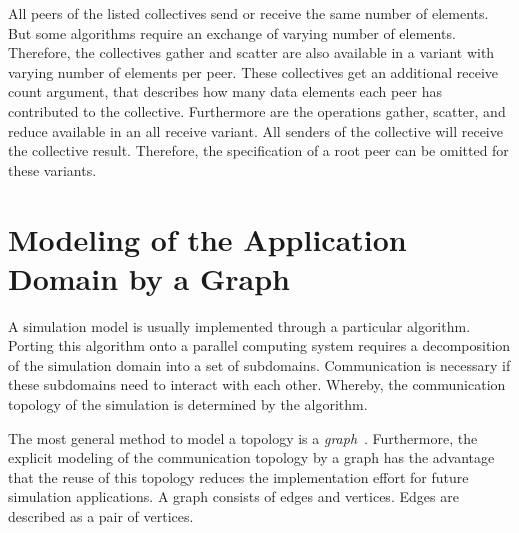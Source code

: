 \noindent All peers of the listed collectives send or receive the same
number of elements.  But some algorithms require an exchange of
varying number of elements. Therefore, the collectives gather and
scatter are also available in a variant with varying number of
elements per peer. These collectives get an additional receive count
argument, that describes how many data elements each peer has
contributed to the collective. Furthermore are the operations gather,
scatter, and reduce available in an all receive variant. All senders
of the collective will receive the collective result. Therefore, the
specification of a root peer can be omitted for these variants.


\section{Modeling of the Application Domain by a Graph}
\label{sec:graph}
A simulation model is usually implemented through a particular
algorithm.  Porting this algorithm onto
a parallel computing system requires a decomposition of the simulation
domain into a set of subdomains. Communication is necessary if these
subdomains need to interact with each other.  Whereby, the
communication topology of the simulation is determined by the
algorithm.



The most general method to model a topology is a
\emph{graph}~\cite{ref:graph}. Furthermore, the explicit modeling of
the communication topology by a graph has the advantage that the reuse
of this topology reduces the implementation effort for future
simulation applications.  A graph consists of edges and
vertices. Edges are described as a pair of vertices.

